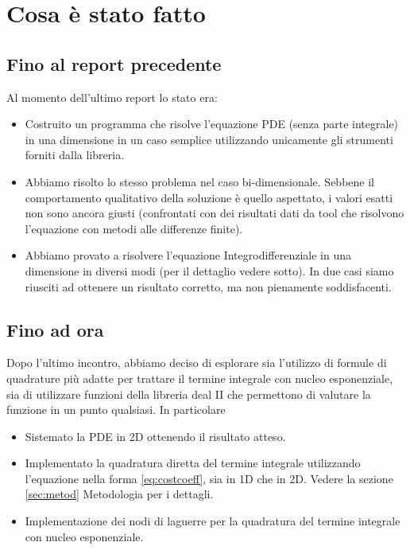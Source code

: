 \documentclass[a4paper,10pt]{article}
\begin{document}
\section{Cosa è stato fatto}

\subsection{Fino al report precedente}
Al momento dell'ultimo report lo stato era:

\begin{itemize}
 \item Costruito un programma che risolve l'equazione PDE  (senza parte integrale) in una dimensione in un caso semplice utilizzando unicamente gli strumenti forniti dalla libreria.
 \item Abbiamo risolto lo stesso problema nel caso bi-dimensionale. Sebbene il comportamento qualitativo della soluzione è quello aspettato, i valori esatti non sono ancora giusti (confrontati con dei risultati dati da tool che risolvono l'equazione con metodi alle differenze finite).
 \item Abbiamo provato a risolvere l'equazione Integrodifferenziale in una dimensione in diversi modi (per il dettaglio vedere sotto). In due casi siamo riusciti ad ottenere un risultato corretto, ma non pienamente soddisfacenti.
\end{itemize}

\subsection{Fino ad ora}

Dopo l'ultimo incontro, abbiamo deciso di esplorare sia l'utilizzo di formule di quadrature più adatte per trattare il termine integrale con nucleo esponenziale, sia di utilizzare funzioni della libreria deal II che permettono di valutare la funzione in un punto qualsiasi. In particolare

\begin{itemize}
 \item Sistemato la PDE in 2D ottenendo il risultato atteso.
 \item Implementato la quadratura diretta del termine integrale utilizzando l'equazione nella forma \eqref{eq:costcoeff}, sia in 1D che in 2D. Vedere la sezione \ref{sec:metod} Metodologia per i dettagli.
 \item Implementazione dei nodi di laguerre per la quadratura del termine integrale con nucleo esponenziale.
\end{itemize}
\end{document}
